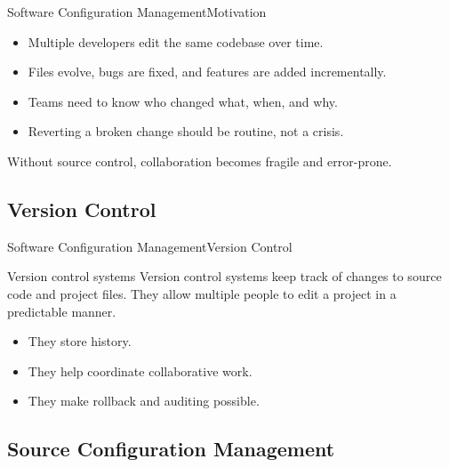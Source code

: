 \documentclass[10pt,compress]{beamer}
\begin{document}
\begin{frame}{Software Configuration Management}{Motivation}
\begin{itemize}
 \item Multiple developers edit the same codebase over time.
 \item Files evolve, bugs are fixed, and features are added incrementally.
 \item Teams need to know who changed what, when, and why.
 \item Reverting a broken change should be routine, not a crisis.
\end{itemize}

\bigskip

Without source control, collaboration becomes fragile and error-prone.
\end{frame}

\subsection{Version Control}

\begin{frame}{Software Configuration Management}{Version Control}
\begin{block}{Version control systems}
Version control systems keep track of changes to source code and project files.
They allow multiple people to edit a project in a predictable manner.
\end{block}

\begin{itemize}
 \item They store history.
 \item They help coordinate collaborative work.
 \item They make rollback and auditing possible.
\end{itemize}
\end{frame}

\subsection{Source Configuration Management}
\end{document}
